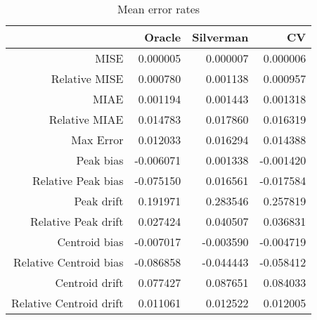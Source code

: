 \begin{table}[ht]
\centering
\begin{tabular}{rrrr}
  \hline
 & Oracle & Silverman & CV \\ 
  \hline
MISE & 0.000005 & 0.000007 & 0.000006 \\ 
  Relative MISE & 0.000780 & 0.001138 & 0.000957 \\ 
  MIAE & 0.001194 & 0.001443 & 0.001318 \\ 
  Relative MIAE & 0.014783 & 0.017860 & 0.016319 \\ 
  Max Error & 0.012033 & 0.016294 & 0.014388 \\ 
  Peak bias & -0.006071 & 0.001338 & -0.001420 \\ 
  Relative Peak bias & -0.075150 & 0.016561 & -0.017584 \\ 
  Peak drift & 0.191971 & 0.283546 & 0.257819 \\ 
  Relative Peak drift & 0.027424 & 0.040507 & 0.036831 \\ 
  Centroid bias & -0.007017 & -0.003590 & -0.004719 \\ 
  Relative Centroid bias & -0.086858 & -0.044443 & -0.058412 \\ 
  Centroid drift & 0.077427 & 0.087651 & 0.084033 \\ 
  Relative Centroid drift & 0.011061 & 0.012522 & 0.012005 \\ 
   \hline
\end{tabular}
\caption{Mean error rates} 
\label{tbl:mean_error_rates}
\end{table}
